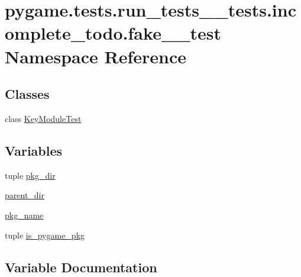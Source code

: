 \hypertarget{namespacepygame_1_1tests_1_1run__tests____tests_1_1incomplete__todo_1_1fake__3__test}{}\section{pygame.\+tests.\+run\+\_\+tests\+\_\+\+\_\+tests.\+incomplete\+\_\+todo.\+fake\+\_\+\_\+test Namespace Reference}
\label{namespacepygame_1_1tests_1_1run__tests____tests_1_1incomplete__todo_1_1fake__3__test}
\subsection*{Classes}
\begin{DoxyCompactItemize}
\item 
class \hyperlink{classpygame_1_1tests_1_1run__tests____tests_1_1incomplete__todo_1_1fake__3__test_1_1_key_module_test}{Key\+Module\+Test}
\end{DoxyCompactItemize}
\subsection*{Variables}
\begin{DoxyCompactItemize}
\item 
tuple \hyperlink{namespacepygame_1_1tests_1_1run__tests____tests_1_1incomplete__todo_1_1fake__3__test_a29e86d78f53deaf8982f0cfb93cf5ad0}{pkg\+\_\+dir}
\item 
\hyperlink{namespacepygame_1_1tests_1_1run__tests____tests_1_1incomplete__todo_1_1fake__3__test_ab0c13608f9996c6676059ed629b2a266}{parent\+\_\+dir}
\item 
\hyperlink{namespacepygame_1_1tests_1_1run__tests____tests_1_1incomplete__todo_1_1fake__3__test_ad7387e7352b6ec3a7f58226bd68cb7c5}{pkg\+\_\+name}
\item 
tuple \hyperlink{namespacepygame_1_1tests_1_1run__tests____tests_1_1incomplete__todo_1_1fake__3__test_ad54930529feb8efe47e71ef128aeeb23}{is\+\_\+pygame\+\_\+pkg}
\end{DoxyCompactItemize}


\subsection{Variable Documentation}
\mbox{\label{namespacepygame_1_1tests_1_1run__tests____tests_1_1incomplete__todo_1_1fake__3__test_ad54930529feb8efe47e71ef128aeeb23}} 
